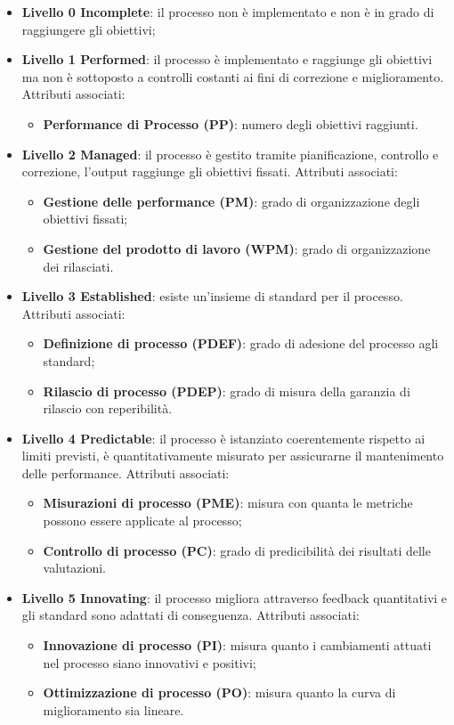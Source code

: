 \begin{itemize}
	\item \textbf{Livello 0 Incomplete}: il processo non è implementato e non è in grado di raggiungere gli obiettivi;
	\item \textbf{Livello 1 Performed}: il processo è implementato e raggiunge gli obiettivi ma non è sottoposto a controlli costanti ai fini di correzione e miglioramento.
	Attributi associati:
	\begin{itemize}
		\item \textbf{Performance di Processo (PP)}: numero degli obiettivi raggiunti.
	\end{itemize}
	\item \textbf{Livello 2 Managed}: il processo è gestito tramite pianificazione, controllo e correzione, l'output raggiunge gli obiettivi fissati.
	Attributi associati:
	\begin{itemize}
		\item \textbf{Gestione delle performance (PM)}: grado di organizzazione degli obiettivi fissati;
		\item \textbf{Gestione del prodotto di lavoro (WPM)}: grado di organizzazione dei  rilasciati.
	\end{itemize}
	\item \textbf{Livello 3 Established}: esiste un'insieme di standard per il processo.
	Attributi associati:
	\begin{itemize}
		\item \textbf{Definizione di processo (PDEF)}: grado di adesione del processo agli standard;
		\item \textbf{Rilascio di processo (PDEP)}: grado di misura della garanzia di rilascio con reperibilità.
	\end{itemize}
	\item \textbf{Livello 4 Predictable}: il processo è istanziato coerentemente rispetto ai limiti previsti, è quantitativamente misurato per assicurarne il mantenimento delle performance.
	Attributi associati:
	\begin{itemize}
		\item \textbf{Misurazioni di processo (PME)}: misura con quanta  le metriche possono essere applicate al processo;
		\item \textbf{Controllo di processo (PC)}: grado di predicibilità dei risultati delle valutazioni.
	\end{itemize}
	\item \textbf{Livello 5 Innovating}: il processo migliora attraverso feedback quantitativi e gli standard sono adattati di conseguenza.
	Attributi associati:
	\begin{itemize}
		\item \textbf{Innovazione di processo (PI)}: misura quanto i cambiamenti attuati nel processo siano innovativi e positivi;
		\item \textbf{Ottimizzazione di processo (PO)}: misura quanto la curva di miglioramento sia lineare.
	\end{itemize}
\end{itemize}
